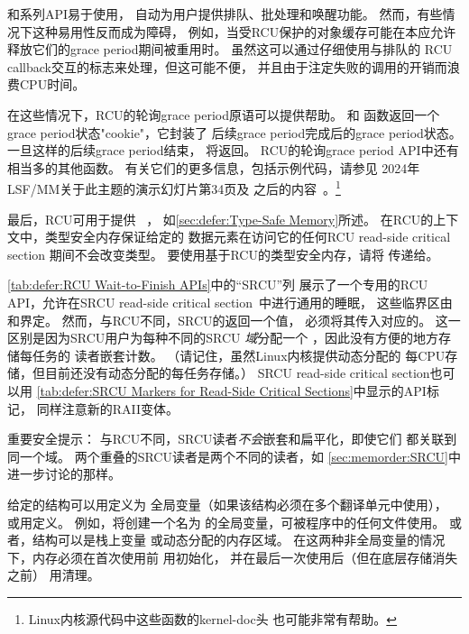 和系列API易于使用，
自动为用户提供排队、批处理和唤醒功能。
然而，有些情况下这种易用性反而成为障碍，
例如，当受RCU保护的对象缓存可能在本应允许
释放它们的grace period期间被重用时。
虽然这可以通过仔细使用与排队的
RCU callback交互的标志来处理，但这可能不便，
并且由于注定失败的调用的开销而浪费CPU时间。

在这些情况下，RCU的轮询grace period原语可以提供帮助。
和
函数返回一个grace period状态"cookie"，它封装了
后续grace period完成后的grace period状态。
一旦这样的后续grace period结束，
将返回。
RCU的轮询grace period API中还有相当多的其他函数。
有关它们的更多信息，包括示例代码，请参见
2024年LSF/MM关于此主题的演示幻灯片第34页及
之后的内容~\cite{PaulEMcKenney2024ReclamationInteractionsWithRCU}。\footnote{
	Linux内核源代码中这些函数的kernel-doc头
	也可能非常有帮助。}

最后，RCU可用于提供
~\cite{Cheriton96a}，
如\cref{sec:defer:Type-Safe Memory}所述。
在RCU的上下文中，类型安全内存保证给定的
数据元素在访问它的任何RCU read-side critical section
期间不会改变类型。
要使用基于RCU的类型安全内存，请将
传递给。

\cref{tab:defer:RCU Wait-to-Finish APIs}中的``SRCU''列
展示了一个专用的RCU API，允许在SRCU read-side
critical section~\cite{PaulEMcKenney2006c}中进行通用的睡眠，
这些临界区由和界定。
然而，与RCU不同，SRCU的返回一个值，
必须将其传入对应的。
这一区别是因为SRCU用户为每种不同的SRCU \emph{域}分配一个
，因此没有方便的地方存储每任务的
读者嵌套计数。
（请记住，虽然Linux内核提供动态分配的
每CPU存储，但目前还没有动态分配的每任务存储。）
SRCU read-side critical section也可以用
\cref{tab:defer:SRCU Markers for Read-Side Critical Sections}中显示的API标记，
同样注意新的RAII变体。

重要安全提示：
与RCU不同，SRCU读者\emph{不会}嵌套和扁平化，即使它们
都关联到同一个域。
两个重叠的SRCU读者是两个不同的读者，如
\cref{sec:memorder:SRCU}中进一步讨论的那样。

给定的结构可以用定义为
全局变量（如果该结构必须在多个翻译单元中使用），
或用定义。
例如，将创建一个名为
的全局变量，可被程序中的任何文件使用。
或者，结构可以是栈上变量
或动态分配的内存区域。
在这两种非全局变量的情况下，内存必须在首次使用前
用初始化，
并在最后一次使用后（但在底层存储消失之前）
用清理。

